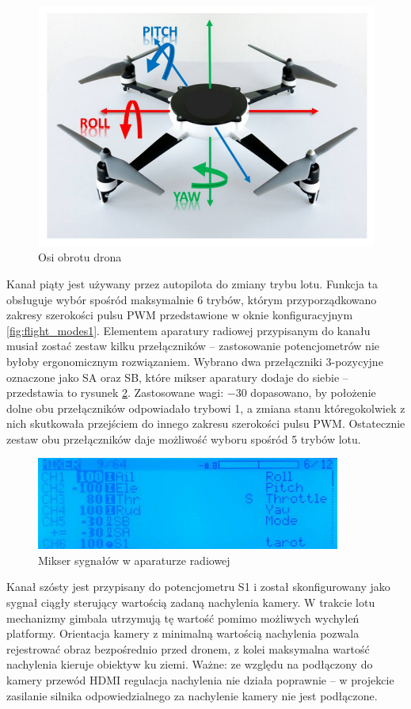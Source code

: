 \begin{figure}[ht]
	\centering
	\includegraphics[width=12cm]{B_rotational_axes.png}
	\caption{Osi obrotu drona \cite{Bouhali2017}}
	\label{fig:flight_axes}
\end{figure}

Kanał piąty jest używany przez autopilota do zmiany trybu lotu. 
Funkcja ta obsługuje wybór spośród maksymalnie 6 trybów, którym przyporządkowano zakresy szerokości pulsu PWM przedstawione w oknie konfiguracyjnym \ref{fig:flight_modes1}. 
Elementem aparatury radiowej przypisanym do kanału musiał zostać zestaw kilku przełączników -- zastosowanie potencjometrów nie byłoby ergonomicznym rozwiązaniem. 
Wybrano dwa przełączniki 3-pozycyjne oznaczone jako SA oraz SB, które mikser aparatury dodaje do siebie -- przedstawia to rysunek \ref{fig:mixer}.
Zastosowane wagi: $-30$ dopasowano, by położenie dolne obu przełączników odpowiadało trybowi 1, a zmiana stanu któregokolwiek z nich skutkowała przejściem do innego zakresu szerokości pulsu PWM. 
Ostatecznie zestaw obu przełączników daje możliwość wyboru spośród 5 trybów lotu.
\begin{figure}[ht]
	\centering
	\includegraphics[width=10cm]{B_mixer.png}
	\caption{Mikser sygnałów w aparaturze radiowej}
	\label{fig:mixer}
\end{figure}

Kanał szósty jest przypisany do potencjometru S1 i został skonfigurowany jako sygnał ciągły sterujący wartością zadaną nachylenia kamery. 
W trakcie lotu  mechanizmy gimbala utrzymują tę wartość pomimo możliwych wychyleń platformy. 
Orientacja kamery z minimalną wartością nachylenia pozwala rejestrować obraz bezpośrednio przed dronem, z kolei maksymalna wartość nachylenia kieruje obiektyw ku ziemi.
Ważne: ze względu na podłączony do kamery przewód HDMI regulacja nachylenia nie działa poprawnie -- w projekcie zasilanie silnika odpowiedzialnego za nachylenie kamery nie jest podłączone.

